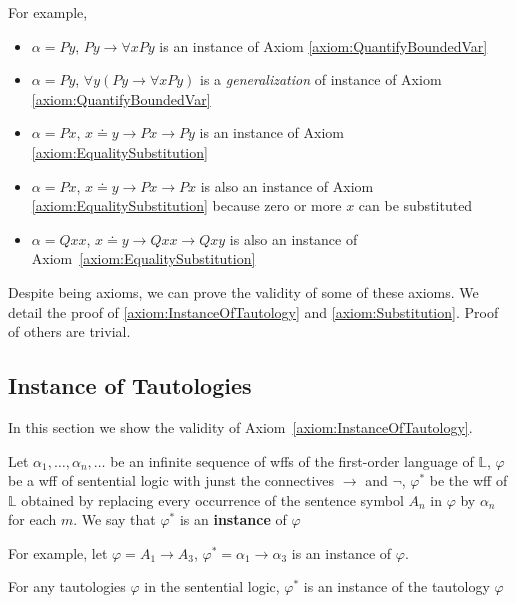 For example,

\begin{itemize}
    \item $\alpha=Py$, $Py \to \forall x Py$ is an instance of Axiom \ref{axiom:QuantifyBoundedVar}
    \item $\alpha=Py$, $\forall y(Py\to \forall xPy)$ is a \emph{generalization} of instance of Axiom \ref{axiom:QuantifyBoundedVar}
    \item $\alpha = Px$, $x \doteq y \to Px\to Py$ is an instance of Axiom \ref{axiom:EqualitySubstitution}
    \item $\alpha = Px$, $x \doteq y \to Px \to Px$ is also an instance of Axiom \ref{axiom:EqualitySubstitution} because zero or more $x$ can be substituted
    \item $\alpha = Qxx$, $x\doteq y \to Qxx \to Qxy$ is also an instance of Axiom~\ref{axiom:EqualitySubstitution}
\end{itemize}

Despite being axioms, we can prove the validity of some of these axioms. We detail the proof of \ref{axiom:InstanceOfTautology} and \ref{axiom:Substitution}. Proof of others are trivial.

\subsection{Instance of Tautologies}

In this section we show the validity of Axiom~\ref{axiom:InstanceOfTautology}.

\begin{definition}
    Let $\alpha_1,\dots,\alpha_n,\dots$ be an infinite sequence of wffs of the first-order language of $\mathbb{L}$, $\varphi$ be a wff of sentential logic with junst the connectives $\to$ and $\neg$, $\varphi^\ast$ be the wff of $\mathbb{L}$ obtained by replacing every occurrence of the sentence symbol $A_n$ in $\varphi$ by $\alpha_n$ for each $m$. We say that $\varphi^\ast$ is an \textbf{instance} of $\varphi$
\end{definition}

For example, let $\varphi=A_1\to A_3$, $\varphi^\ast = \alpha_1 \to \alpha_3$ is an instance of $\varphi$.

\begin{definition}
    For any tautologies $\varphi$ in the sentential logic, $\varphi^\ast$ is an instance of the tautology $\varphi$
\end{definition}

